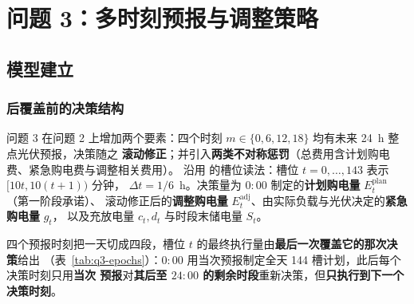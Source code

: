 
\section{问题 3：多时刻预报与调整策略}\label{chap:q3}

\subsection{模型建立}

\subsubsection{后覆盖前的决策结构}

问题 3 在问题 2 上增加两个要素：四个时刻 \(m\in\{0,6,12,18\}\) 均有未来 24~h 整点光伏预报，决策随之
\textbf{滚动修正}；并引入\textbf{两类不对称惩罚}（总费用含计划购电费、紧急购电费与调整相关费用）。
沿用  的槽位读法：槽位 \(t=0,\dots,143\) 表示 \([10t,10(t+1))\) 分钟，
\(\Delta t=1/6\)~h。决策量为 \(0{:}00\) 制定的\textbf{计划购电量} \(E^{\text{plan}}_t\)（第一阶段承诺）、
滚动修正后的\textbf{调整购电量} \(E^{\text{adj}}_t\)、由实际负载与光伏决定的\textbf{紧急购电量} \(g_t\)，
以及充放电量 \(c_t,d_t\) 与时段末储电量 \(S_t\)。

四个预报时刻把一天切成四段，槽位 \(t\) 的最终执行量由\textbf{最后一次覆盖它的那次决策}给出
（表~\ref{tab:q3-epochs}）：\(0{:}00\) 用当次预报制定全天 144 槽计划，此后每个决策时刻只用\textbf{当次
预报}对\textbf{其后至 \(24{:}00\) 的剩余时段}重新决策，但\textbf{只执行到下一个决策时刻}。

